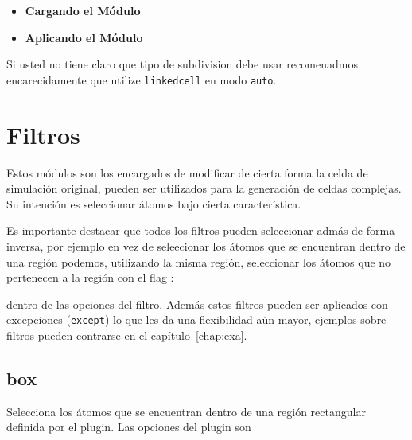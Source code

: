 \begin{itemize}
 \item \textbf{Cargando el M\'odulo}
 \item \textbf{Aplicando el M\'odulo}
\end{itemize}

Si usted no tiene claro que tipo de subdivision debe usar recomenadmos encarecidamente que utilize \verb|linkedcell| en modo \verb|auto|.
\section{Filtros}
Estos m\'odulos son los encargados de modificar de cierta forma la celda de simulaci\'on original, pueden ser utilizados para la generaci\'on de celdas complejas. Su intenci\'on es seleccionar \'atomos bajo cierta caracter\'istica.

Es importante destacar que todos los filtros pueden seleccionar adm\'as de forma inversa, por ejemplo en vez de seleecionar los \'atomos que se encuentran dentro de una regi\'on podemos, utilizando la misma regi\'on, seleccionar los \'atomos que no pertenecen a la regi\'on con el flag :


dentro de las opciones del filtro. Adem\'as estos filtros pueden ser aplicados con excepciones (\verb|except|) lo que les da una flexibilidad a\'un mayor, ejemplos sobre filtros pueden contrarse en el cap\'itulo~\ref{chap:exa}.

\subsection{box}
Selecciona los \'atomos que se encuentran dentro de una regi\'on rectangular definida por el plugin. Las opciones del plugin son


